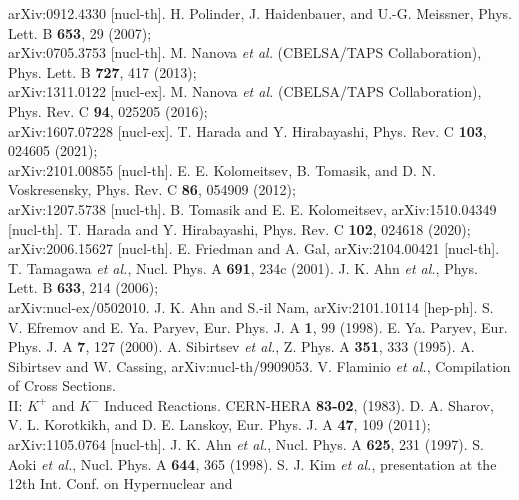 \documentclass[12pt]{article}
\begin{document}
\begin{thebibliography}{99}
                                    arXiv:0912.4330 [nucl-th].
 H. Polinder, J. Haidenbauer, and U.-G. Meissner, Phys. Lett. B {\bf 653}, 29 (2007);\\
                            arXiv:0705.3753 [nucl-th].
 M. Nanova {\it et al.} (CBELSA/TAPS Collaboration), Phys. Lett. B {\bf 727}, 417 (2013);\\
                            arXiv:1311.0122 [nucl-ex].
 M. Nanova {\it et al.} (CBELSA/TAPS Collaboration), Phys. Rev. C {\bf 94}, 025205 (2016);\\
                            arXiv:1607.07228 [nucl-ex].
 T. Harada and Y. Hirabayashi, Phys. Rev. C {\bf 103}, 024605 (2021);\\
                                    arXiv:2101.00855 [nucl-th].
 E. E. Kolomeitsev, B. Tomasik, and D. N. Voskresensky, Phys. Rev. C {\bf 86}, 054909 (2012);\\
                                    arXiv:1207.5738 [nucl-th].
 B. Tomasik and E. E. Kolomeitsev, arXiv:1510.04349 [nucl-th].
 T. Harada and Y. Hirabayashi, Phys. Rev. C {\bf 102}, 024618 (2020);\\
                                    arXiv:2006.15627 [nucl-th].
 E. Friedman and A. Gal, arXiv:2104.00421 [nucl-th].
 T. Tamagawa {\it et al.}, Nucl. Phys. A {\bf 691}, 234c (2001).
 J. K. Ahn {\it et al.}, Phys. Lett. B {\bf 633}, 214 (2006);\\
                                         arXiv:nucl-ex/0502010.
 J. K. Ahn and S.-il Nam, arXiv:2101.10114 [hep-ph].
 S. V. Efremov and  E. Ya. Paryev, Eur. Phys. J. A {\bf 1}, 99 (1998).
 E. Ya. Paryev, Eur. Phys. J. A {\bf 7}, 127 (2000).
 A. Sibirtsev {\it et al.}, Z. Phys. A {\bf 351}, 333 (1995).
 A. Sibirtsev and W. Cassing, arXiv:nucl-th/9909053.
 V. Flaminio {\it et al.}, Compilation of Cross Sections.\\
             II: ${K^+}$ and ${K^-}$ Induced Reactions. CERN-HERA {\bf 83-02}, (1983).
 D. A. Sharov, V. L. Korotkikh, and  D. E. Lanskoy, Eur. Phys. J. A {\bf 47}, 109 (2011);\\
                              arXiv:1105.0764 [nucl-th].
 J. K. Ahn {\it et al.}, Nucl. Phys. A {\bf 625}, 231 (1997).
 S. Aoki {\it et al.}, Nucl. Phys. A {\bf 644}, 365 (1998).
 S. J. Kim {\it et al.}, presentation at the 12th Int. Conf. on Hypernuclear and\\

\end{thebibliography}
\end{document}
